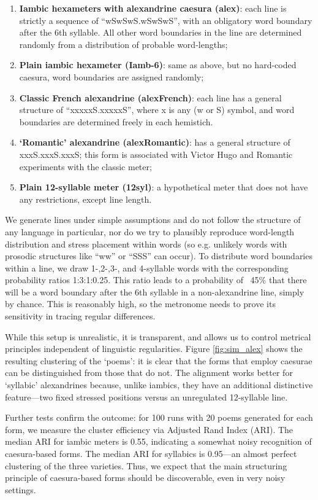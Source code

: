 \documentclass[
    hf
]{ceurart}
\begin{document}
\begin{enumerate}
    \item \textbf{Iambic hexameters with alexandrine caesura (alex)}: each line is strictly a sequence of “wSwSwS.wSwSwS”, with an obligatory word boundary after the 6th syllable. All other word boundaries in the line are determined randomly from a distribution of probable word-lengths;
    \item \textbf{Plain iambic hexameter (Iamb-6)}: same as above, but no hard-coded caesura, word boundaries are assigned randomly;
    \item \textbf{Classic French alexandrine (alexFrench)}: each line has a general structure of “xxxxxS.xxxxxS”, where x is any (w or S) symbol, and word boundaries are determined freely in each hemistich.
    \item \textbf{`Romantic' alexandrine (alexRomantic)}: has a general structure of xxxS.xxxS.xxxS; this form is associated with Victor Hugo and Romantic experiments with the classic meter;
    \item \textbf{Plain 12-syllable meter (12syl)}: a hypothetical meter that does not have any restrictions, except line length.
\end{enumerate}

We generate lines under simple assumptions and do not follow the structure of any language in particular, nor do we try to plausibly reproduce word-length distribution and stress placement within words (so e.g. unlikely words with prosodic structures like “ww” or “SSS” can occur). To distribute word boundaries within a line,  we draw 1-,2-,3-, and 4-syllable words with the corresponding probability ratios 1:3:1:0.25. This ratio leads to a  probability of ~45\% that there will be a word boundary after the 6th syllable in a non-alexandrine line, simply by chance. This is reasonably high, so the metronome needs to prove its sensitivity in tracing regular differences.

While this setup is unrealistic, it is transparent, and allows us to control metrical principles independent of linguistic regularities. Figure \ref{fig:sim_alex} shows the resulting clustering of the `poems': it is clear that the forms that employ caesurae can be distinguished from those that do not. The alignment works better for `syllabic' alexandrines because, unlike iambics, they have an additional distinctive feature---two fixed stressed positions versus an unregulated 12-syllable line.

Further tests confirm the outcome: for 100 runs with 20 poems generated for each form, we measure the cluster efficiency via Adjusted Rand Index (ARI). The median ARI for iambic meters is 0.55, indicating a somewhat noisy recognition of caesura-based forms. The median ARI for syllabics is 0.95---an almost perfect clustering of the three varieties. Thus, we expect that the main structuring principle of caesura-based forms should be discoverable, even in very noisy settings.

\onecolumn
\end{document}

